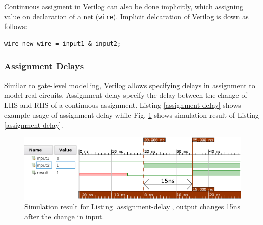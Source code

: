 \documentclass[a4paper,10pt]{article}
\theoremstyle{mytheor}
\newcommand{
  \insertverilog}[3]{
  
}
\begin{document}
Continuous assigment in Verilog can also be done implicitly, which
assigning value on declaration of a net
(\lstinline[style=verilog-inline-style]{wire}). Implicit delcaration
of Verilog is down as follows:
\begin{lstlisting}[style=verilog-inline-style,xleftmargin=.25\textwidth]
  wire new_wire = input1 & input2;
\end{lstlisting}

\subsubsection{Assignment Delays}
Similar to gate-level modelling, Verilog allows specifying delays in
assignment to model real circuits. Assignment delay specify the delay
between the change of LHS and RHS of a continuous assignment. Listing
\ref{assignment-delay} shows example usage of assignment delay while
Fig. \ref{assignment-delay-sim} shows simulation result of Listing
\ref{assignment-delay}.

\insertverilog{./verilog_files/assignmentDelay.v}{assignment-delay}{Using assignment delay in Verilog.}

\begin{figure}[!h] \centering  
  \includegraphics[width=0.8\linewidth]{./resources/assignmentDelay.png}
  \caption{Simulation result for Listing \ref{assignment-delay}, output changes 15ns after the change in input.} 
  \label{assignment-delay-sim}
\end{figure}
\end{document}
